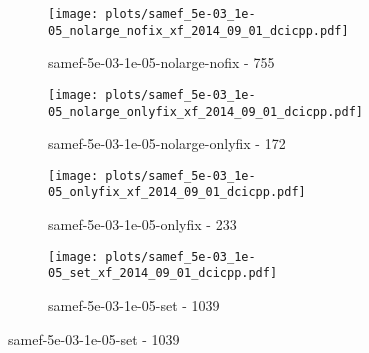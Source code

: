 \begin{figure}[H]
\begin{subfigure}{0.48\textwidth}
  \end{subfigure}
  \begin{subfigure}{0.48\textwidth}
    \texttt{[image: plots/samef\_5e-03\_1e-05\_nolarge\_nofix\_xf\_2014\_09\_01\_dcicpp.pdf]}
    \caption{samef-5e-03-1e-05-nolarge-nofix - 755}
  \end{subfigure}
  \begin{subfigure}{0.48\textwidth}
    \texttt{[image: plots/samef\_5e-03\_1e-05\_nolarge\_onlyfix\_xf\_2014\_09\_01\_dcicpp.pdf]}
    \caption{samef-5e-03-1e-05-nolarge-onlyfix - 172}
  \end{subfigure}
  \begin{subfigure}{0.48\textwidth}
    \texttt{[image: plots/samef\_5e-03\_1e-05\_onlyfix\_xf\_2014\_09\_01\_dcicpp.pdf]}
    \caption{samef-5e-03-1e-05-onlyfix - 233}
  \end{subfigure}
  \begin{subfigure}{0.48\textwidth}
    \texttt{[image: plots/samef\_5e-03\_1e-05\_set\_xf\_2014\_09\_01\_dcicpp.pdf]}
    \caption{samef-5e-03-1e-05-set - 1039}
  \end{subfigure}
\end{figure}

